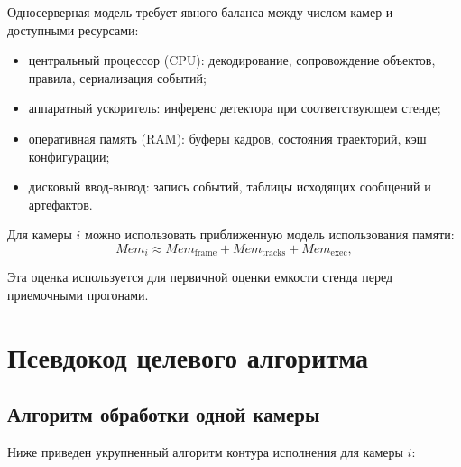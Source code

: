 Односерверная модель требует явного баланса между числом камер и доступными ресурсами:
\begin{itemize}
    \item центральный процессор (CPU): декодирование, сопровождение объектов, правила, сериализация событий;
    \item аппаратный ускоритель: инференс детектора при соответствующем стенде;
    \item оперативная память (RAM): буферы кадров, состояния траекторий, кэш конфигурации;
    \item дисковый ввод-вывод: запись событий, таблицы исходящих сообщений и артефактов.
\end{itemize}

Для камеры \(i\) можно использовать приближенную модель использования памяти:
\begin{equation}
Mem_i \approx Mem_{\text{frame}} + Mem_{\text{tracks}} + Mem_{\text{exec}},
\end{equation}
\where
{}

Эта оценка используется для первичной оценки емкости стенда перед приемочными прогонами.

\section{Псевдокод целевого алгоритма}

\subsection{Алгоритм обработки одной камеры}

Ниже приведен укрупненный алгоритм контура исполнения для камеры \(i\):


